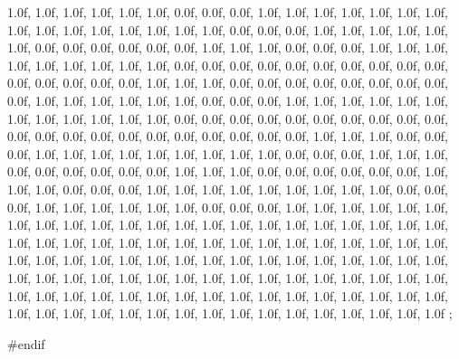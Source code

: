 {   1.0f, 1.0f, 1.0f,   1.0f, 1.0f, 1.0f,   0.0f, 0.0f, 0.0f,   1.0f, 1.0f, 1.0f,   1.0f, 1.0f, 1.0f,   1.0f, 1.0f, 1.0f,   1.0f, 1.0f, 1.0f,   1.0f, 1.0f, 1.0f,   0.0f, 0.0f, 0.0f,   1.0f, 1.0f, 1.0f,   1.0f, 1.0f, 1.0f,   0.0f, 0.0f, 0.0f,   0.0f, 0.0f, 0.0f,   1.0f, 1.0f, 1.0f,   0.0f, 0.0f, 0.0f,   1.0f, 1.0f, 1.0f,   1.0f, 1.0f, 1.0f,   1.0f, 1.0f, 1.0f,   0.0f, 0.0f, 0.0f,   0.0f, 0.0f, 0.0f,   0.0f, 0.0f, 0.0f,   0.0f, 0.0f, 0.0f,   0.0f, 0.0f, 0.0f,   1.0f, 1.0f, 1.0f,   0.0f, 0.0f, 0.0f,   0.0f, 0.0f, 0.0f,   0.0f, 0.0f, 0.0f,   1.0f, 1.0f, 1.0f,   1.0f, 1.0f, 1.0f,   0.0f, 0.0f, 0.0f,   1.0f, 1.0f, 1.0f,   1.0f, 1.0f, 1.0f,   
   1.0f, 1.0f, 1.0f,   1.0f, 1.0f, 1.0f,   0.0f, 0.0f, 0.0f,   0.0f, 0.0f, 0.0f,   0.0f, 0.0f, 0.0f,   0.0f, 0.0f, 0.0f,   0.0f, 0.0f, 0.0f,   0.0f, 0.0f, 0.0f,   0.0f, 0.0f, 0.0f,   1.0f, 1.0f, 1.0f,   0.0f, 0.0f, 0.0f,   1.0f, 1.0f, 1.0f,   1.0f, 1.0f, 1.0f,   1.0f, 1.0f, 1.0f,   0.0f, 0.0f, 0.0f,   1.0f, 1.0f, 1.0f,   0.0f, 0.0f, 0.0f,   0.0f, 0.0f, 0.0f,   1.0f, 1.0f, 1.0f,   0.0f, 0.0f, 0.0f,   0.0f, 0.0f, 0.0f,   1.0f, 1.0f, 1.0f,   0.0f, 0.0f, 0.0f,   1.0f, 1.0f, 1.0f,   1.0f, 1.0f, 1.0f,   1.0f, 1.0f, 1.0f,   0.0f, 0.0f, 0.0f,   1.0f, 1.0f, 1.0f,   1.0f, 1.0f, 1.0f,   0.0f, 0.0f, 0.0f,   1.0f, 1.0f, 1.0f,   1.0f, 1.0f, 1.0f,   
   1.0f, 1.0f, 1.0f,   1.0f, 1.0f, 1.0f,   1.0f, 1.0f, 1.0f,   1.0f, 1.0f, 1.0f,   1.0f, 1.0f, 1.0f,   1.0f, 1.0f, 1.0f,   1.0f, 1.0f, 1.0f,   1.0f, 1.0f, 1.0f,   1.0f, 1.0f, 1.0f,   1.0f, 1.0f, 1.0f,   1.0f, 1.0f, 1.0f,   1.0f, 1.0f, 1.0f,   1.0f, 1.0f, 1.0f,   1.0f, 1.0f, 1.0f,   1.0f, 1.0f, 1.0f,   1.0f, 1.0f, 1.0f,   1.0f, 1.0f, 1.0f,   1.0f, 1.0f, 1.0f,   1.0f, 1.0f, 1.0f,   1.0f, 1.0f, 1.0f,   1.0f, 1.0f, 1.0f,   1.0f, 1.0f, 1.0f,   1.0f, 1.0f, 1.0f,   1.0f, 1.0f, 1.0f,   1.0f, 1.0f, 1.0f,   1.0f, 1.0f, 1.0f,   1.0f, 1.0f, 1.0f,   1.0f, 1.0f, 1.0f,   1.0f, 1.0f, 1.0f,   1.0f, 1.0f, 1.0f,   1.0f, 1.0f, 1.0f,   1.0f, 1.0f, 1.0f
};
   
#endif   
